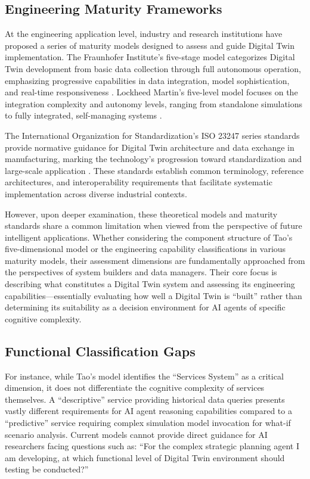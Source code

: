 \subsection{Engineering Maturity Frameworks}

At the engineering application level, industry and research institutions have proposed a series of maturity models designed to assess and guide Digital Twin implementation. The Fraunhofer Institute's five-stage model categorizes Digital Twin development from basic data collection through full autonomous operation, emphasizing progressive capabilities in data integration, model sophistication, and real-time responsiveness \cite{kritzinger2018digital}. Lockheed Martin's five-level model focuses on the integration complexity and autonomy levels, ranging from standalone simulations to fully integrated, self-managing systems \cite{rasheed2020digital}.

The International Organization for Standardization's ISO 23247 series standards provide normative guidance for Digital Twin architecture and data exchange in manufacturing, marking the technology's progression toward standardization and large-scale application \cite{ISO23247}. These standards establish common terminology, reference architectures, and interoperability requirements that facilitate systematic implementation across diverse industrial contexts.

However, upon deeper examination, these theoretical models and maturity standards share a common limitation when viewed from the perspective of future intelligent applications. Whether considering the component structure of Tao's five-dimensional model or the engineering capability classifications in various maturity models, their assessment dimensions are fundamentally approached from the perspectives of system builders and data managers. Their core focus is describing what constitutes a Digital Twin system and assessing its engineering capabilities—essentially evaluating how well a Digital Twin is ``built'' rather than determining its suitability as a decision environment for AI agents of specific cognitive complexity.

\subsection{Functional Classification Gaps}

For instance, while Tao's model identifies the ``Services System'' as a critical dimension, it does not differentiate the cognitive complexity of services themselves. A ``descriptive'' service providing historical data queries presents vastly different requirements for AI agent reasoning capabilities compared to a ``predictive'' service requiring complex simulation model invocation for what-if scenario analysis. Current models cannot provide direct guidance for AI researchers facing questions such as: ``For the complex strategic planning agent I am developing, at which functional level of Digital Twin environment should testing be conducted?''

